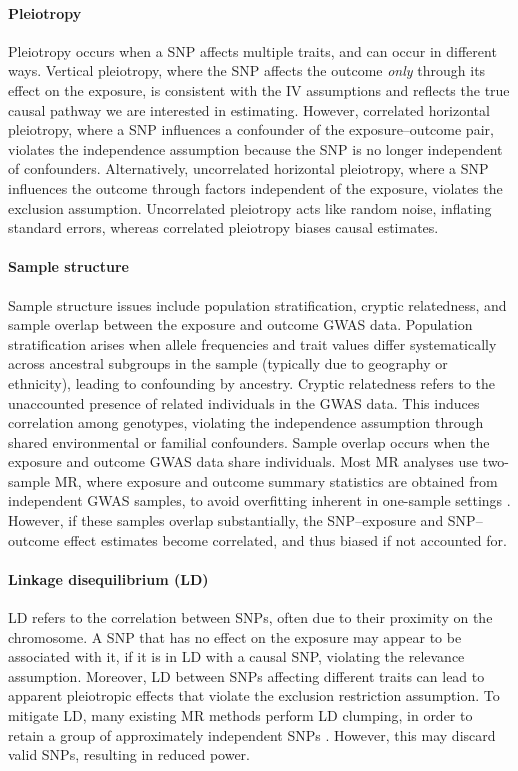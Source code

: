 \documentclass[12pt]{article}
\begin{document}
\paragraph{Pleiotropy}
Pleiotropy occurs when a SNP affects multiple traits, and can occur in different ways. Vertical pleiotropy, where the SNP affects the outcome \textit{only} through its effect on the exposure, is consistent with the IV assumptions and reflects the true causal pathway we are interested in estimating. However, correlated horizontal pleiotropy, where a SNP influences a confounder of the exposure–outcome pair, violates the independence assumption because the SNP is no longer independent of confounders. Alternatively, uncorrelated horizontal pleiotropy, where a SNP influences the outcome through factors independent of the exposure, violates the exclusion assumption. Uncorrelated pleiotropy acts like random noise, inflating standard errors, whereas correlated pleiotropy biases causal estimates.

\paragraph{Sample structure} 
Sample structure issues include population stratification, cryptic relatedness, and sample overlap between the exposure and outcome GWAS data. Population stratification arises when allele frequencies and trait values differ systematically across ancestral subgroups in the sample (typically due to geography or ethnicity), leading to confounding by ancestry. Cryptic relatedness refers to the unaccounted presence of related individuals in the GWAS data. This induces correlation among genotypes, violating the independence assumption through shared environmental or familial confounders. Sample overlap occurs when the exposure and outcome GWAS data share individuals. Most MR analyses use two-sample MR, where exposure and outcome summary statistics are obtained from independent GWAS samples, to avoid overfitting inherent in one-sample settings \citep{Hu2022, Zhang2025}. However, if these samples overlap substantially, the SNP–exposure and SNP–outcome effect estimates become correlated, and thus biased if not accounted for. 

\paragraph{Linkage disequilibrium (LD)} 
LD refers to the correlation between SNPs, often due to their proximity on the chromosome. A SNP that has no effect on the exposure may appear to be associated with it, if it is in LD with a causal SNP, violating the relevance assumption. Moreover, LD between SNPs affecting different traits can lead to apparent pleiotropic effects that violate the exclusion restriction assumption. To mitigate LD, many existing MR methods perform LD clumping, in order to retain a group of approximately independent SNPs \citep{Hu2022, Zhang2025}. However, this may discard valid SNPs, resulting in reduced power.
\end{document}
